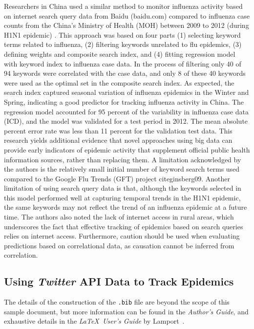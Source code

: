 \documentclass[sigconf]{acmart}
\begin{document}
Researchers in China used a similar method to monitor influenza activity based on
internet search query data from Baidu (baidu.com) compared to influenza case counts 
from the China’s Ministry of Health (MOH) between 2009 to 2012 (during H1N1 epidemic) 
\cite{yuan13}. This approach was based on four parts (1) selecting keyword terms related 
to influenza, (2) filtering keywords unrelated to flu epidemics, (3) defining weights 
and composite search index, and (4) fitting regression model with keyword index to 
influenza case data. In the process of filtering only 40 of 94 keywords were correlated 
with the case data, and only 8 of these 40 keywords were used as the optimal set in the 
composite search index. As expected, the search index captured seasonal variation of 
influenza epidemics in the Winter and Spring, indicating a good predictor for tracking 
influenza activity in China. The regression model accounted for 95 percent of the
variability in influenza case data (ICD), and the model was validated for a test period 
in 2012. The mean absolute percent error rate was less than 11 percent for the validation
test data. This research yields additional evidence that novel approaches using big data 
can provide early indicators of epidemic activity that supplement official public health 
information sources, rather than replacing them. A limitation acknowledged by the authors
is the relatively small initial number of keyword search terms used compared to the 
Google Flu Trends (GFT) project cite{ginsberg09}. Another limitation of using search 
query data is that, although the keywords selected in this model performed well at 
capturing temporal trends in the H1N1 epidemic, the same keywords may not reflect the 
trend of an influenza epidemic at a future time. The authors also noted the lack of 
internet access in rural areas, which underscores the fact that effective tracking of 
epidemics based on search queries relies on internet access. Furthermore, caution should 
be used when evaluating predictions based on correlational data, as causation cannot be 
inferred from correlation.

\subsection{Using {\itshape Twitter} API Data to Track Epidemics}

The details of the construction of the \texttt{.bib} file are beyond
the scope of this sample document, but more information can be found
in the \textit{Author's Guide}, and exhaustive details in the \textit{\LaTeX\
User's Guide} by Lamport~.
\end{document}
